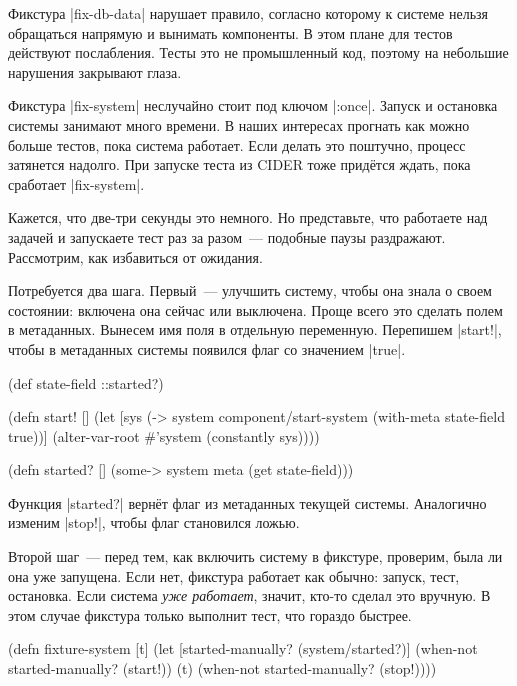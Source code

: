 Фикстура \spverb|fix-db-data| нарушает правило, согласно которому к системе
нельзя обращаться напрямую и вынимать компоненты. В этом плане для тестов
действуют послабления. Тесты это не промышленный код, поэтому на небольшие
нарушения закрывают глаза.

Фикстура \spverb|fix-system| неслучайно стоит под ключом \spverb|:once|. Запуск
и остановка системы занимают много времени. В наших интересах прогнать как можно
больше тестов, пока система работает. Если делать это поштучно, процесс
затянется надолго. При запуске теста из CIDER тоже прид\"{е}тся ждать, пока
сработает \spverb|fix-system|.

Кажется, что две-три секунды это немного. Но представьте, что работаете над
задачей и запускаете тест раз за разом~--- подобные паузы
раздражают. Рассмотрим, как избавиться от ожидания.


Потребуется два шага. Первый~--- улучшить систему, чтобы она знала о своем
состоянии: включена она сейчас или выключена. Проще всего это сделать полем в
метаданных. Вынесем имя поля в отдельную переменную. Перепишем \spverb|start!|,
чтобы в метаданных системы появился флаг со значением \spverb|true|.

\begin{english}
  \begin{clojure}
(def state-field ::started?)

(defn start! []
  (let [sys (-> system
                component/start-system
                (with-meta {state-field true}))]
    (alter-var-root #'system (constantly sys))))

(defn started? []
  (some-> system meta (get state-field)))
  \end{clojure}
\end{english}

Функция \spverb|started?| верн\"{е}т флаг из метаданных текущей системы. Аналогично
изменим \spverb|stop!|, чтобы флаг становился ложью.

Второй шаг~--- перед тем, как включить систему в фикстуре, проверим, была ли она
уже запущена. Если нет, фикстура работает как обычно: запуск, тест,
остановка. Если система \emph{уже работает}, значит, кто-то сделал это
вручную. В этом случае фикстура только выполнит тест, что гораздо быстрее.

\begin{english}
  \begin{clojure}
(defn fixture-system [t]
  (let [started-manually? (system/started?)]
    (when-not started-manually?
      (start!))
    (t)
    (when-not started-manually?
      (stop!))))
  \end{clojure}
\end{english}

